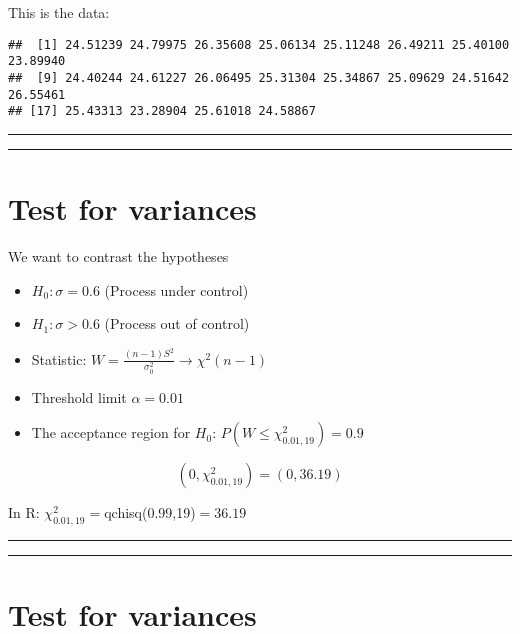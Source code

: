 \documentclass[
]{book}
\begin{document}
This is the data:

\begin{verbatim}
##  [1] 24.51239 24.79975 26.35608 25.06134 25.11248 26.49211 25.40100 23.89940
##  [9] 24.40244 24.61227 26.06495 25.31304 25.34867 25.09629 24.51642 26.55461
## [17] 25.43313 23.28904 25.61018 24.58867
\end{verbatim}

\begin{center}\rule{0.5\linewidth}{0.5pt}\end{center}

\begin{center}\rule{0.5\linewidth}{0.5pt}\end{center}

\hypertarget{test-for-variances-4}{%
\section{Test for variances}\label{test-for-variances-4}}

We want to contrast the hypotheses

\begin{itemize}
\item
  \(H_0:\sigma=0.6\) (Process under control)
\item
  \(H_1:\sigma > 0.6\) (Process out of control)
\item
  Statistic: \(W=\frac{(n-1)S^2}{\sigma_0^2} \rightarrow \chi^2(n-1)\)
\item
  Threshold limit \(\alpha=0.01\)
\item
  The acceptance region for \(H_0\): \(P(W\leq \chi^2_{0.01,19})=0.9\)
\end{itemize}

\[(0, \chi^2_{0.01,19})=(0,36.19)\]

In R: \(\chi^2_{0.01,19}=\)qchisq(0.99,19)\(= 36.19\)

\begin{center}\rule{0.5\linewidth}{0.5pt}\end{center}

\begin{center}\rule{0.5\linewidth}{0.5pt}\end{center}

\hypertarget{test-for-variances-5}{%
\section{Test for variances}\label{test-for-variances-5}}
\end{document}
